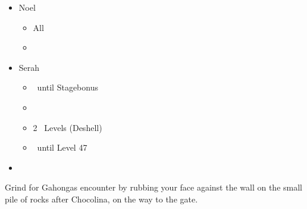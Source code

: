 
\livet{\tri}


\begin{menu}
	\begin{itemize}
		\crystarium
		\begin{itemize}
			\item Noel
			      \begin{itemize}
				      \item All \rav
				      \item {}
			      \end{itemize}
			\item Serah
			      \begin{itemize}
				      \item \rav\ until Stagebonus
				      \item \stagebonus{\sab}
				      \item 2 \sab\ Levels (Deshell)
				      \item \rav\ until Level 47
			      \end{itemize}
		\end{itemize}
		\paradigm
		\begin{itemize}
			\item {}%
			      {\paradigmline{\com}{\com}{\nek}{\X}}%
			      {\paradigmline{\com}{\com}{\nek}{\W}}%
			      {\paradigmline[3]{\textit{\rav}}{\textit{(\sab)}}{\textit{\nek}}{\textit{\W}}}%
			      {\paradigmline{\sen}{\sen}{\nek}{\W}}%
			      {\paradigmline{\rav}{\rav}{\nek}{\W}}%
			      {\paradigmline{\rav}{\rav}{\nek}{\W}}
		\end{itemize}
	\end{itemize}
\end{menu}

\renewcommand{\third}{[3] Smart Bomb-W (\rav/\sab/\nek)}

Grind for Gahongas encounter by rubbing your face against the wall on the small pile of rocks after Chocolina, on the way to the gate.

